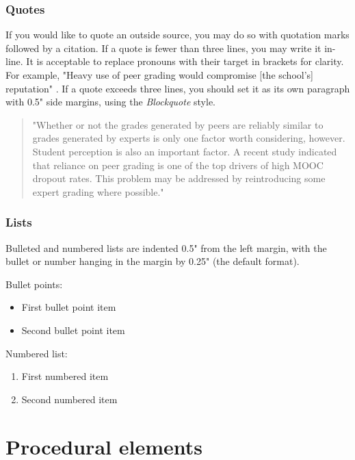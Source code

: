 \documentclass[
	letterpaper, %
]{jdf}
\begin{document}
\subsubsection{Quotes}
If you would like to quote an outside source, you may do so with quotation marks followed by a citation. If a quote is fewer than three lines, you may write it 
in-line. It is acceptable to replace pronouns with their target in brackets for clarity. For example, "Heavy use of peer grading would compromise [the school’s] 
reputation" \citep{joyner2016}. If a quote exceeds three lines, you should set it as its own paragraph with 0.5" side margins, using the \emph{Blockquote} style.

\begin{quotation}
"Whether or not the grades generated by peers are reliably similar to grades generated by experts is only one factor worth considering, however. Student perception 
is also an important factor. A recent study indicated that reliance on peer grading is one of the top drivers of high MOOC dropout rates. This problem may be 
addressed by reintroducing some expert grading where possible." \citep{joyner2016}
\end{quotation}

\subsubsection{Lists}
Bulleted and numbered lists are indented 0.5" from the left margin, with the bullet or number hanging in the margin by 0.25" (the default format).

Bullet points:

\begin{itemize}
	\item First bullet point item
	\item Second bullet point item
\end{itemize}

Numbered list:

\begin{enumerate}
	\item First numbered item
	\item Second numbered item
\end{enumerate}

\section{Procedural elements}
\end{document}

